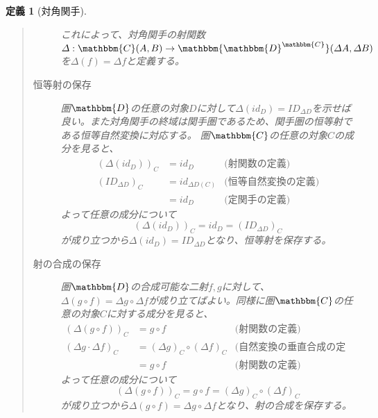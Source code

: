 \documentclass[uplatex,dvipdfmx]{jsarticle}
\newcommand{\cat}[1]{\mathbbm{#1}}
\newcommand{\arrow}{\rightarrow}
\newcommand{\mor}[3]{#1:#2\arrow #3}
\newcommand{\arset}[3]{\cat{#1}(#2,#3)}
\newcommand{\funccat}[2]{\cat{#2}^\cat{#1}}
\newtheorem{define}{定義}[section]
\numberwithin{proof}{subsection}
\numberwithin{prop}{subsection}
\numberwithin{define}{subsection}
\begin{document}
\begin{define}[対角関手]
\begin{quote}
\begin{description}
\begin{center}
        \end{center}

        これによって、対角関手の射関数$\mor{\varDelta}{\arset{C}{A}{B}}{\arset{\funccat{C}{D}}{\varDelta A}{\varDelta B}}$を$\varDelta(f)=\varDelta f$と定義する。

				\item[恒等射の保存] 圏$\cat{D}$の任意の対象$D$に対して$\varDelta(id_D)=ID_{\varDelta D}$を示せば良い。また対角関手の終域は関手圏であるため、関手圏の恒等射である恒等自然変換に対応する。
        圏$\cat{C}$の任意の対象$C$の成分を見ると、
        \begin{align*}
          (\varDelta (id_D))_C &= id_D &\text{(射関数の定義)}\\
          (ID_{\varDelta D})_C &= id_{\varDelta D(C)}&\text{(恒等自然変換の定義)}\\
          &= id_D&\text{(定関手の定義)}
        \end{align*}
        よって任意の成分について\[(\varDelta (id_D))_C=id_D=(ID_{\varDelta D})_C\]が成り立つから$\varDelta(id_D)=ID_{\varDelta D}$となり、恒等射を保存する。

				\item[射の合成の保存] 圏$\cat{D}$の合成可能な二射$f,g$に対して、$\varDelta(g\circ f)=\varDelta g\circ \varDelta f$が成り立てばよい。同様に圏$\cat{C}$の任意の対象$C$に対する成分を見ると、
        \begin{align*}
          (\varDelta(g\circ f))_C&=g\circ f&\text{(射関数の定義)}\\
          (\varDelta g\cdot\varDelta f)_C &= (\varDelta g)_C\circ (\varDelta f)_C&\text{(自然変換の垂直合成の定義)}\\
          &=g\circ f&\text{(射関数の定義)}
        \end{align*}
        よって任意の成分について\[(\varDelta(g\circ f))_C=g\circ f=(\varDelta g)_C\circ (\varDelta f)_C\]が成り立つから$\varDelta(g\circ f)=\varDelta g\circ \varDelta f$となり、射の合成を保存する。
			\end{description}
		\end{quote}
  \end{define}
\end{document}
